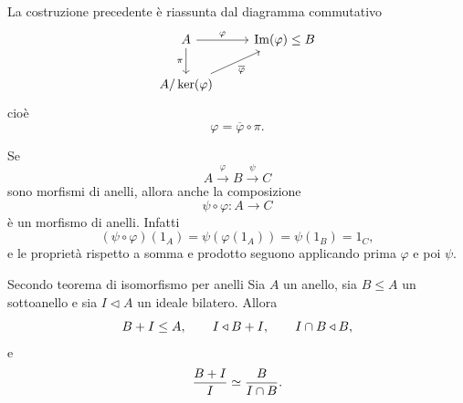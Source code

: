 \documentclass[a4paper]{article}
\begin{document}
\begin{radioactive}
La costruzione precedente è riassunta dal diagramma commutativo
\[
    \begin{tikzcd}
        A \arrow[r, "\varphi"] \arrow[d, "\pi"'] & \operatorname{Im}(\varphi) \leq B \\
        A/\ker(\varphi) \arrow[ur, "\overline{\varphi}"']
    \end{tikzcd}
\]
cioè
\[
    \varphi=\overline{\varphi}\circ \pi.
\]
\end{radioactive}

\begin{radioactive}
Se
\[
    A \xrightarrow{\varphi} B \xrightarrow{\psi} C
\]
sono morfismi di anelli, allora anche la composizione
\[
    \psi\circ\varphi\colon A\to C
\]
è un morfismo di anelli. Infatti
\[
    (\psi\circ\varphi)(1_A)
    =
    \psi(\varphi(1_A))
    =
    \psi(1_B)
    =
    1_C,
\]
e le proprietà rispetto a somma e prodotto seguono applicando prima \(\varphi\) e poi \(\psi\).
\end{radioactive}

\begin{radioactive}
\begin{snippettheorem}{Secondo teorema di isomorfismo per anelli}
    Sia \(A\) un anello, sia \(B\leq A\) un sottoanello e sia \(I\triangleleft A\) un ideale bilatero.
    Allora
    \[
        B+I\leq A,
        \qquad
        I\triangleleft B+I,
        \qquad
        I\cap B\triangleleft B,
    \]
    e
    \[
        \frac{B+I}{I}
        \simeq
        \frac{B}{I\cap B}.
    \]
\end{snippettheorem}
\end{radioactive}
\end{document}

